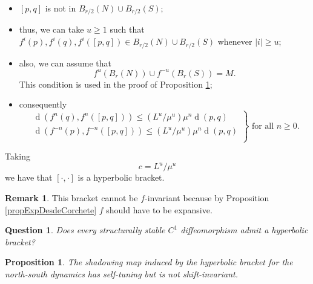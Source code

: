 \documentclass[12pt]{amsart}
\theoremstyle{plain}
\newtheorem{prop}[thm]{Proposition}
\newtheorem{que}[thm]{Question}
\theoremstyle{definition}
\newtheorem{rmk}[thm]{Remark}
\theoremstyle{remark}
\DeclareMathOperator{\dist}{d}
\newcommand{\violeta}[1]{\textcolor{magenta}{#1}}
\begin{document}
\begin{itemize}
	\item $[p,q]$ is not in $B_{r/2}(N)\cup B_{r/2}(S)$;
	\item thus, we can take $u\geq 1$ such that
	$f^i(p),f^i(q),f^i([p,q])\in B_{r/2}(N)\cup B_{r/2}(S)$ whenever $|i|\geq u$;
	\item also, we can assume that
	\begin{equation}
		\label{ecuUNS}
		f^u(B_r(N))\cup f^{-u}(B_r(S))=M.
	\end{equation}
	This condition is used in the proof of Proposition \ref{propNoShInvNS};
	\item consequently
	\begin{equation}
		\left.
		\begin{array}{r}
			\dist(f^{n} (q),f^{n} ([p,q]))\leq (L^u/\mu^u) \mu^n\dist(p,q)\\
			\dist(f^{-n}(p),f^{-n}([p,q]))\leq (L^u/\mu^u) \mu^n\dist(p,q)\\
		\end{array}
		\right\}\text{ for all }n\geq 0.
	\end{equation}
\end{itemize}
Taking
\begin{equation}
	\label{ecuC'CorchNS}
	c=L^u/\mu^u
\end{equation}
we have that $[\cdot,\cdot]$ is a hyperbolic bracket.

\begin{rmk}
	This bracket cannot be $f$-invariant because by Proposition \ref{propExpDesdeCorchete} $f$ should have to be expansive.
\end{rmk}


\begin{que}
Does every structurally stable $C^1$ diffeomorphism
admit a hyperbolic bracket?
\end{que}

\begin{prop}
	\label{propNoShInvNS}
	The shadowing map
induced by the hyperbolic bracket for the north-south dynamics has self-tuning but is not shift-invariant.
\end{prop}
\end{document}
